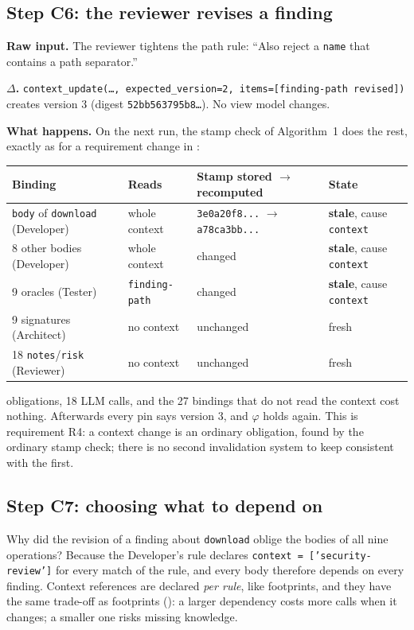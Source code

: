 \documentclass[10pt,a4paper]{article}
\newcommand{\code}[1]{\texttt{#1}}
\theoremstyle{definition}
\newcommand{\what}[1]{\par\smallskip\noindent\textbf{#1}\quad}
\begin{document}
\subsection{Step C6: the reviewer revises a finding}\label{sec:context-revise}

\what{Raw input.} The reviewer tightens the path rule: ``Also reject a
\code{name} that contains a path separator.''

\what{$\Delta$.} \code{context\_update(\ldots, expected\_version=2,
items=[finding-path revised])} creates version 3 (digest
\code{52bb563795b8\ldots}). No view model changes.

\what{What happens.} On the next run, the stamp check of Algorithm~1 does the
rest, exactly as for a requirement change in :

\begin{center}\small
\begin{tabular}{@{}l l l l@{}}
\toprule
Binding & Reads & Stamp stored $\rightarrow$ recomputed & State \\
\midrule
\code{body} of \code{download} (Developer) & whole context & \code{3e0a20f8...} $\rightarrow$ \code{a78ca3bb...} & \textbf{stale}, cause \code{context} \\
8 other bodies (Developer) & whole context & changed & \textbf{stale}, cause \code{context} \\
9 oracles (Tester) & \code{finding-path} & changed & \textbf{stale}, cause \code{context} \\
9 signatures (Architect) & no context & unchanged & fresh \\
18 \code{notes}/\code{risk} (Reviewer) & no context & unchanged & fresh \\
\bottomrule
\end{tabular}
\end{center}

 obligations, 18 LLM calls, and the 27 bindings that do not read
the context cost nothing. Afterwards every pin says version 3, and $\varphi$
holds again. This is requirement R4: a context change is an ordinary
obligation, found by the ordinary stamp check; there is no second
invalidation system to keep consistent with the first.

\subsection{Step C7: choosing what to depend on}\label{sec:context-precision}

Why did the revision of a finding about \code{download} oblige the bodies of
all nine operations? Because the Developer's rule declares
\code{context = ['security-review']} for every match of the rule, and every
body therefore depends on every finding. Context references are declared
\emph{per rule}, like footprints, and they have the same trade-off as
footprints (): a larger dependency costs more calls when it
changes; a smaller one risks missing knowledge.
\end{document}
